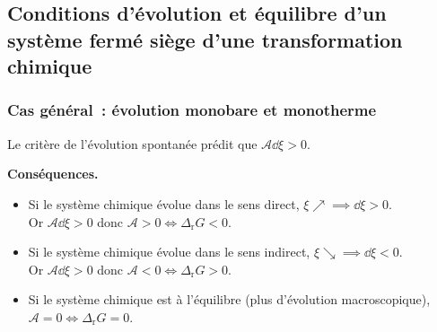 \documentclass{article}
\newcommand{\Dr}{\Delta_{\mathrm{r}}}
\begin{document}
\subsection{Conditions d'évolution et équilibre d'un système fermé siège d'une transformation chimique}
\subsubsection{Cas général~: évolution monobare et monotherme}
\begin{tableau}
    \begin{enonce}
        Le critère de l'évolution spontanée prédit que $\mathscr{A}\dd{\xi} >0$.
    \end{enonce}
    \textbf{Conséquences.}
    \begin{itemize}
        \item Si le système chimique évolue dans le sens direct, $\xi \nearrow \implies \dd{\xi} >0$.\\
        Or $\mathscr{A}\dd{\xi} >0$ donc $\mathscr{A}>0 \iff \Dr G<0$.
        \item Si le système chimique évolue dans le sens indirect, $\xi \searrow \implies \dd{\xi} <0$.\\
        Or $\mathscr{A}\dd{\xi} >0$ donc $\mathscr{A}<0 \iff \Dr G>0$.
        \item Si le système chimique est à l'équilibre (plus d'évolution macroscopique), $\mathscr{A}=0\iff \Dr G=0$.
    \end{itemize}
\end{tableau}
\end{document}
